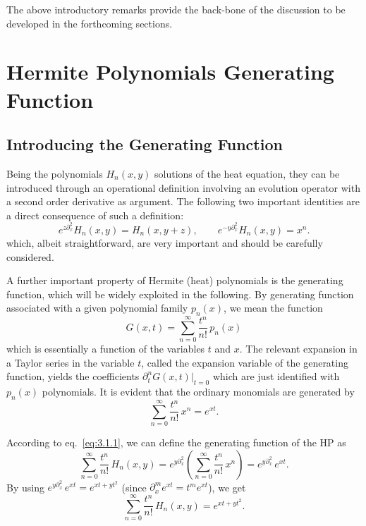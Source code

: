 The above introductory remarks provide the back-bone of the
discussion to be developed in the forthcoming sections.

\section{Hermite Polynomials Generating Function}
\label{sec:3.2}

\subsection{Introducing the Generating Function}
\label{sec:3.2.1}

Being the polynomials $H_n(x,y)$ solutions of the heat equation,
they can be introduced through an operational definition involving an
evolution operator with a second order derivative as argument. The
following two important identities are a direct consequence of such a
definition:
\begin{equation}
e^{z\partial_x^2}H_n(x,y)=H_n(x,y+z),\qquad
e^{-y\partial_x^2}H_n(x,y)=x^n.
\label{eq:3.2.1}
\end{equation}
which, albeit straightforward, are very important and should be
carefully considered.

A further important property of Hermite (heat) polynomials is the
generating function, which will be widely exploited in the following.
By generating function associated with a given polynomial family
$p_n(x)$, we mean the function
\begin{equation}
G(x,t)=\sum_{n=0}^{\infty}\frac{t^n}{n!}\,p_n(x)
\label{eq:3.2.2}
\end{equation}
which is essentially a function of the variables $t$ and $x$. The
relevant expansion in a Taylor series in the variable $t$, called the
expansion variable of the generating function, yields the
coefficients $\partial_t^n G(x,t)|_{t=0}$ which are just identified
with $p_n(x)$ polynomials. It is evident that the ordinary
monomials are generated by
\begin{equation}
\sum_{n=0}^{\infty}\frac{t^n}{n!}\,x^n=e^{xt}.
\label{eq:3.2.3}
\end{equation}

According to eq.~\eqref{eq:3.1.1}, we can define the generating
function of the HP as
\[
\sum_{n=0}^{\infty}\frac{t^n}{n!}\,H_n(x,y)
=e^{y\partial_x^2}\!\left(\sum_{n=0}^{\infty}\frac{t^n}{n!}\,x^n\right)
=e^{y\partial_x^2}\,e^{xt}.
\]
By using $e^{y\partial_x^2}\,e^{xt}=e^{xt+yt^2}$ (since
$\partial_x^m e^{xt}=t^m e^{xt}$), we get
\begin{equation}
\sum_{n=0}^{\infty}\frac{t^n}{n!}\,H_n(x,y)=e^{xt+yt^2}.
\label{eq:3.2.5}
\end{equation}

